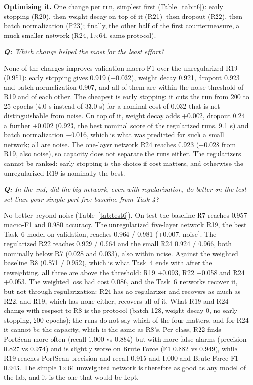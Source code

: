\documentclass[9pt]{extarticle}
\newcommand{\qa}[1]{\par\vspace{2pt}\noindent\textit{\textbf{Q:} #1}\par\nopagebreak\noindent}
\newcommand{\run}[1]{\textsf{#1}}   %
\begin{document}
\textbf{Optimising it.} One change per run, simplest first (Table~\ref{tab:t6}): early stopping
(\run{R20}), then weight decay on top of it (\run{R21}), then dropout (\run{R22}), then batch
normalization (\run{R23}); finally, the other half of the first countermeasure, a much smaller
network (\run{R24}, 1$\times$64, same protocol).

\qa{Which change helped the most for the least effort?}
None of the changes improves validation macro-F1 over the unregularized \run{R19} (0.951): early
stopping gives 0.919 ($-$0.032), weight decay 0.921, dropout 0.923 and batch normalization 0.907, and
all of them are within the noise threshold of \run{R19} and of each other. The cheapest is early
stopping: it cuts the run from 200 to 25 epochs (4.0 s instead of 33.0 s) for a nominal cost of
0.032 that is not distinguishable from noise. On top of it, weight decay adds +0.002, dropout 0.24
a further +0.002 (0.923, the best nominal score of the regularized runs, 9.1 s) and batch
normalization $-$0.016, which is what was predicted for such a small network; all are noise. The
one-layer network \run{R24} reaches 0.923 ($-$0.028 from \run{R19}, also noise), so capacity does not
separate the runs either. The regularizers cannot be ranked: early stopping is the choice if cost
matters, and otherwise the unregularized \run{R19} is nominally the best.

\qa{In the end, did the big network, even with regularization, do better on the test set than your
simple port-free baseline from Task 4?}
No better beyond noise (Table~\ref{tab:test6}). On test the baseline \run{R7} reaches 0.957
macro-F1 and 0.980 accuracy. The unregularized five-layer network \run{R19}, the best Task~6 model on
validation, reaches 0.964 / 0.981 (+0.007, noise). The regularized \run{R22} reaches 0.929 / 0.964 and
the small \run{R24} 0.924 / 0.966, both nominally below \run{R7} (0.028 and 0.033), also within noise.
Against the weighted baseline \run{R8} (0.871 / 0.952), which is what Task~4 ends with after the
reweighting, all three are above the threshold: \run{R19} +0.093, \run{R22} +0.058 and \run{R24}
+0.053. The weighted loss had cost 0.086, and the Task~6 networks recover it, but not through
regularization: \run{R24} has no regularizer and recovers as much as \run{R22}, and \run{R19}, which
has none either, recovers all of it. What \run{R19} and \run{R24} change with respect to \run{R8} is
the protocol (batch 128, weight decay 0, no early stopping, 200 epochs); the runs do not say which
of the four matters, and for \run{R24} it cannot be the capacity, which is the same as \run{R8}'s.
Per class, \run{R22} finds PortScan more often (recall 1.000 vs 0.884) but with more false alarms
(precision 0.827 vs 0.974) and is slightly worse on Brute Force (F1 0.882 vs 0.949), while \run{R19}
reaches PortScan precision and recall 0.915 and 1.000 and Brute Force F1 0.943. The simple 1$\times$64
unweighted network is therefore as good as any model of the lab, and it is the one that would be
kept.
\end{document}
